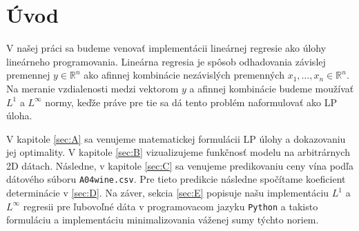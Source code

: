 \documentclass[report.tex]{subfiles}
\begin{document}
	
	\section{Úvod}	
	
	V našej práci sa budeme venovať implementácii lineárnej regresie ako úlohy lineárneho programovania. Lineárna regresia je spôsob odhadovania závislej premennej $y \in \mathbb{R}^n$ ako afinnej kombinácie nezávislých premenných $x_1,\dots,x_n \in \mathbb{R}^n$. Na meranie vzdialenosti medzi vektorom $y$ a afinnej kombinácie budeme moužívať $L^1$ a $L^{\infty}$ normy, keďže práve pre tie sa dá tento problém naformulovať ako LP úloha.
	
	V kapitole \ref{sec:A} sa venujeme matematickej formulácii LP úlohy a dokazovaniu jej optimality. V kapitole \ref{sec:B} vizualizujeme funkčnosť modelu na arbitrárnych 2D dátach. Následne, v kapitole \ref{sec:C} sa venujeme predikovaniu ceny vína podľa dátového súboru \verb|A04wine.csv|. Pre tieto predikcie následne spočítame koeficient determinácie v \ref{sec:D}. Na záver, sekcia \ref{sec:E} popisuje našu implementáciu $L^1$ a $L^{\infty}$ regresii pre ľubovoľné dáta v programovacom jazyku \verb|Python| a takisto formuláciu a implementáciu minimalizovania váženej sumy týchto noriem.
	
\end{document}
